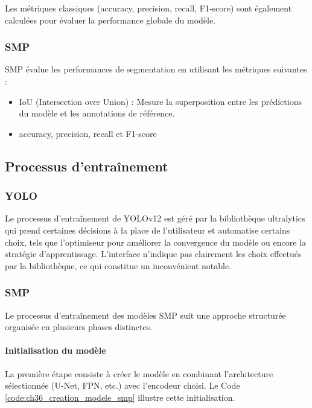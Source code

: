 Les métriques classiques (accuracy, precision, recall, F1-score) sont également calculées pour évaluer la performance globale du modèle.

\subsubsection{SMP}

SMP évalue les performances de segmentation en utilisant les métriques suivantes :
\begin{itemize}
    \item IoU (Intersection over Union) : Mesure la superposition entre les prédictions du modèle et les annotations de référence.
    \item accuracy, precision, recall et F1-score
 \end{itemize}

\subsection{Processus d'entraînement}
\subsubsection{YOLO}
Le processus d'entraînement de YOLOv12 est géré par la bibliothèque ultralytics qui prend certaines décisions à la place de l'utilisateur et automatise certains choix, tels que l'optimiseur pour améliorer la convergence du modèle ou encore la stratégie d'apprentissage. L'interface n'indique pas clairement les choix effectués par la bibliothèque, ce qui constitue un inconvénient notable.

\subsubsection{SMP}
Le processus d'entraînement des modèles SMP suit une approche structurée organisée en plusieurs phases distinctes.

\paragraph{Initialisation du modèle}
La première étape consiste à créer le modèle en combinant l'architecture sélectionnée (U-Net, FPN, etc.) avec l'encodeur choisi. Le Code \ref{code:ch36_creation_modele_smp} illustre cette initialisation.

